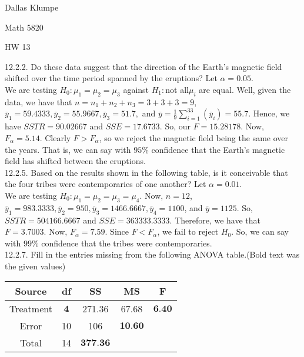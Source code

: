 \documentclass[12pt]{article}
\begin{document}
\noindent Dallas Klumpe

\noindent Math 5820

\noindent HW 13

12.2.2. Do these data suggest that the direction of the Earth’s magnetic field shifted over the time period spanned by the eruptions? Let $\alpha=0.05$.\\
We are testing $H_0:\mu_1=\mu_2=\mu_3$ against $H_1:$not all$\mu_i$ are equal. Well, given the data, we have that $n=n_1+n_2+n_3=3+3+3=9$, $\bar{y}_1=59.4333, \bar{y}_2=55.9667, \bar{y}_3=51.7,$ and $\bar{y}=\frac19\sum_{i=1}^33(\bar{y}_i)=55.7$. Hence, we have $SSTR=90.02667$ and $SSE=17.6733$. So, our $F=15.28178$. Now, $F_{\alpha}=5.14$. Clearly $F>F_{\alpha}$, so we reject the magnetic field being the same over the years. That is, we can say with $95\%$ confidence that the Earth's magnetic field has shifted between the eruptions.\\[20pt]

12.2.5.  Based on the results shown in the following table, is it conceivable that the four tribes were contemporaries of one another? Let $\alpha=0.01$.\\
We are testing $H_0:\mu_1=\mu_2=\mu_3=\mu_4$. Now, $n=12$, $\bar{y}_1=983.3333, \bar{y}_2=950, \bar{y}_3=1466.6667, \bar{y}_4=1100$, and $\bar{y}=1125$. So, $SSTR=504166.6667$ and $SSE=363333.3333$. Therefore, we have that $F=3.7003$. Now, $F_{\alpha}=7.59$. Since $F<F_{\alpha}$, we fail to reject $H_0$. So, we can say with $99\%$ confidence that the tribes were contemporaries.\\[20pt]

12.2.7. Fill in the entries missing from the following ANOVA table.(Bold text was the given values)
\begin{center}
\begin{tabular}{ c|   c   c   c   c  }
Source & df & SS & MS & F\\
\hline
Treatment & $\textbf{4}$ & 271.36 & 67.68 & $\textbf{6.40}$\\
Error & 10 & 106 & $\textbf{10.60}$ & \\
Total & 14 & $\textbf{377.36}$ &  & 
\end{tabular}
\end{center}
\end{document}
